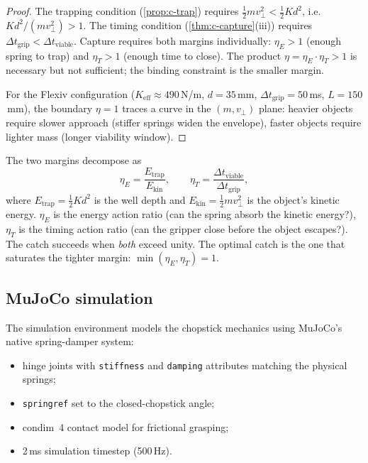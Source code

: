 \begin{proof}
The trapping condition (\cref{prop:c-trap}) requires
$\frac{1}{2}mv_\perp^2 < \frac{1}{2}Kd^2$, i.e.\
$Kd^2/(mv_\perp^2) > 1$.  The timing condition
(\cref{thm:c-capture}(iii)) requires
$\Delta t_{\mathrm{grip}} < \Delta t_{\mathrm{viable}}$.
Capture requires both margins individually: $\eta_E > 1$
(enough spring to trap) and $\eta_T > 1$ (enough time to
close).  The product $\eta = \eta_E \cdot \eta_T > 1$ is
necessary but not sufficient; the binding constraint is
the smaller margin.

For the Flexiv configuration ($K_{\mathrm{eff}} \approx 490$\,N/m,
$d = 35$\,mm, $\Delta t_{\mathrm{grip}} = 50$\,ms,
$L = 150$\,mm), the boundary $\eta = 1$ traces a curve in the
$(m, v_\perp)$ plane: heavier objects require slower approach
(stiffer springs widen the envelope), faster objects require
lighter mass (longer viability window).
\end{proof}

\begin{remark}
The two margins decompose as
\[
  \eta_E = \frac{E_{\mathrm{trap}}}{E_{\mathrm{kin}}},
  \qquad
  \eta_T = \frac{\Delta t_{\mathrm{viable}}}
  {\Delta t_{\mathrm{grip}}},
\]
where $E_{\mathrm{trap}} = \frac{1}{2}Kd^2$ is the well depth
and $E_{\mathrm{kin}} = \frac{1}{2}mv_\perp^2$ is the object's
kinetic energy.  $\eta_E$ is the energy action ratio (can the
spring absorb the kinetic energy?), $\eta_T$ is the timing
action ratio (can the gripper close before the object escapes?).
The catch succeeds when \emph{both} exceed unity.  The
optimal catch is the one that saturates the tighter margin:
$\min(\eta_E, \eta_T) = 1$.
\end{remark}

\subsection{MuJoCo simulation}

The simulation environment models the chopstick mechanics using
MuJoCo's~\cite{mujoco} native spring-damper system:
\begin{itemize}[nosep]
  \item hinge joints with \texttt{stiffness} and \texttt{damping}
  attributes matching the physical springs;
  \item \texttt{springref} set to the closed-chopstick angle;
  \item condim~4 contact model for frictional grasping;
  \item 2\,ms simulation timestep (500\,Hz).
\end{itemize}

